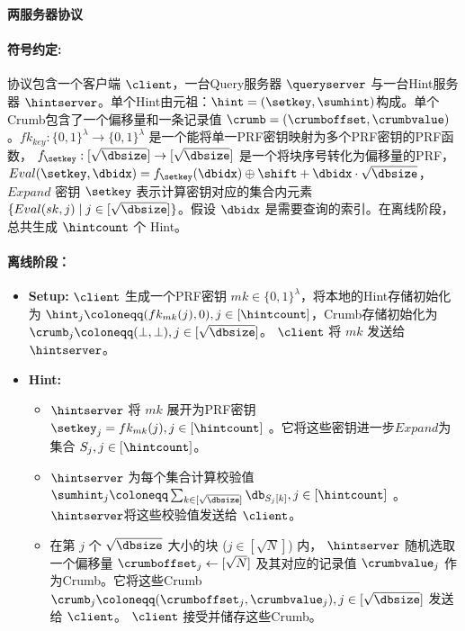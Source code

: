     \begin{mdframed}
        \centering
        \textbf{两服务器协议}

        \raggedright
        \paragraph{符号约定:} 协议包含一个客户端 $\client$，一台Query服务器 $\queryserver$ 与一台Hint服务器 $\hintserver$。单个Hint由元祖：$\hint=(\setkey,\sumhint)$构成。单个Crumb包含了一个偏移量和一条记录值 $\crumb=(\crumboffset,\crumbvalue)$。$fk_{key}:\{0,1\}^\lambda \to \{0,1\}^\lambda$ 是一个能将单一PRF密钥映射为多个PRF密钥的PRF函数， $f_{\setkey}: [\sqrt{\dbsize}]\to [\sqrt{\dbsize}]$ 是一个将块序号转化为偏移量的PRF，  $Eval(\setkey,\dbidx) = f_{\setkey}(\dbidx)\oplus \shift + \dbidx\cdot\sqrt{\dbsize}$，$Expand$ 密钥 $\setkey$ 表示计算密钥对应的集合内元素 $\{Eval(sk,j) \mid j\in[\sqrt{\dbsize}]\}$。假设 $\dbidx$ 是需要查询的索引。在离线阶段，总共生成 $\hintcount$ 个 Hint。

        \paragraph{离线阶段：}
        \begin{itemize}
            \item \textbf{Setup:} $\client$ 生成一个PRF密钥 $mk\in\{0,1\}^\lambda$，将本地的Hint存储初始化为 $\hint_j\coloneqq(fk_{mk}(j),0), j\in [\hintcount]$，Crumb存储初始化为 $\crumb_j\coloneqq (\bot,\bot), j\in [\sqrt{\dbsize}]$。 $\client$ 将 $mk$ 发送给 $\hintserver$。
            \item \textbf{Hint:}
                  \begin{itemize}
                      \item $\hintserver$ 将 $mk$ 展开为PRF密钥 $\setkey_j=fk_{mk}(j), j\in[\hintcount]$ 。它将这些密钥进一步$Expand$为集合 $S_j, j\in[\hintcount]$。
                      \item $\hintserver$ 为每个集合计算校验值 $\sumhint_j\coloneqq \sum_{k\in [\sqrt{\dbsize}]}\db_{S_{j}[k]}, j\in[\hintcount]$ 。$\hintserver$将这些校验值发送给 $\client$。
                      \item 在第 $j$ 个 $\sqrt{\dbsize}$ 大小的块 ($j\in[\sqrt{N}]$) 内， $\hintserver$ 随机选取一个偏移量 $\crumboffset_j\leftarrow [\sqrt{N}]$ 及其对应的记录值 $\crumbvalue_j$ 作为Crumb。它将这些Crumb $\crumb_j \coloneqq  (\crumboffset_j, \crumbvalue_j), j\in [\sqrt{\dbsize}]$ 发送给 $\client$。 $\client$ 接受并储存这些Crumb。
                  \end{itemize}
        \end{itemize}

\end{mdframed}

